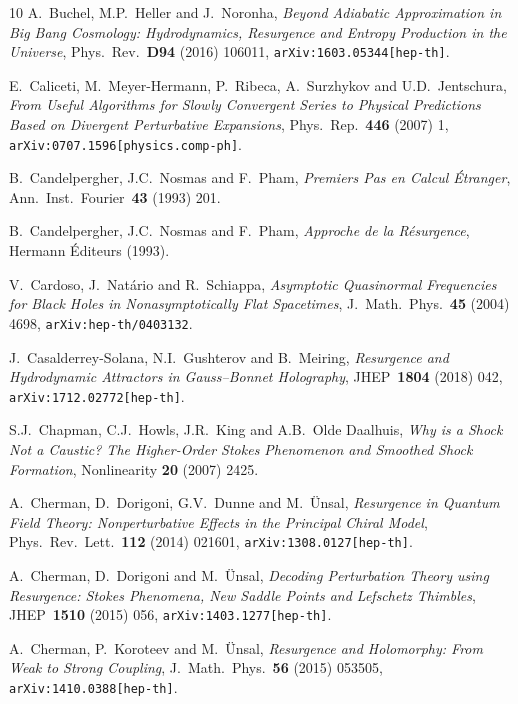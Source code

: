 \documentclass[11pt,a4paper]{article}
\begin{document}
\begin{thebibliography}{10}
A.~Buchel, M.P.~Heller and J.~Noronha,
\textit{Beyond Adiabatic Approximation in Big Bang Cosmology: Hydrodynamics, Resurgence and Entropy Production in the Universe},
Phys.\ Rev.\ \textbf{D94} (2016) 106011,
\texttt{arXiv:1603.05344[hep-th]}.

E.~Caliceti, M.~Meyer-Hermann, P.~Ribeca, A.~Surzhykov and U.D.~Jentschura,
\textit{From Useful Algorithms for Slowly Convergent Series to Physical Predictions Based on Divergent Perturbative Expansions},
Phys.\ Rep.\ \textbf{446} (2007) 1,
\texttt{arXiv:0707.1596[physics.comp-ph]}.

B.~Candelpergher, J.C.~Nosmas and F.~Pham,
\textit{Premiers Pas en Calcul \'Etranger},
Ann.\ Inst.\ Fourier\ \textbf{43} (1993) 201.

B.~Candelpergher, J.C.~Nosmas and F.~Pham,
\textit{Approche de la R\'esurgence},
Hermann \'Editeurs (1993).

V.~Cardoso, J.~Nat\'ario and R.~Schiappa,
\textit{Asymptotic Quasinormal Frequencies for Black Holes in Nonasymptotically Flat Spacetimes},
J.\ Math.\ Phys.\ \textbf{45} (2004) 4698,
\texttt{arXiv:hep-th/0403132}.

J.~Casalderrey-Solana, N.I.~Gushterov and B.~Meiring,
\textit{Resurgence and Hydrodynamic Attractors in Gauss--Bonnet Holography},
JHEP\ \textbf{1804} (2018) 042,
\texttt{arXiv:1712.02772[hep-th]}.

S.J.~Chapman, C.J.~Howls, J.R.~King and A.B.~Olde Daalhuis,
\textit{Why is a Shock Not a Caustic? The Higher-Order Stokes Phenomenon and Smoothed Shock Formation},
Nonlinearity \textbf{20} (2007) 2425.

A.~Cherman, D.~Dorigoni, G.V.~Dunne and M.~\"Unsal,
\textit{Resurgence in Quantum Field Theory: Nonperturbative Effects in the Principal Chiral Model},
Phys.\ Rev.\ Lett.\ \textbf{112} (2014) 021601,
\texttt{arXiv:1308.0127[hep-th]}.

A.~Cherman, D.~Dorigoni and M.~\"Unsal,
\textit{Decoding Perturbation Theory using Resurgence: Stokes Phenomena, New Saddle Points and Lefschetz Thimbles},
JHEP\ \textbf{1510} (2015) 056,
\texttt{arXiv:1403.1277[hep-th]}.

A.~Cherman, P.~Koroteev and M.~\"Unsal,
\textit{Resurgence and Holomorphy: From Weak to Strong Coupling},
J.\ Math.\ Phys.\ \textbf{56} (2015) 053505,
\texttt{arXiv:1410.0388[hep-th]}.


\end{thebibliography}
\end{document}
